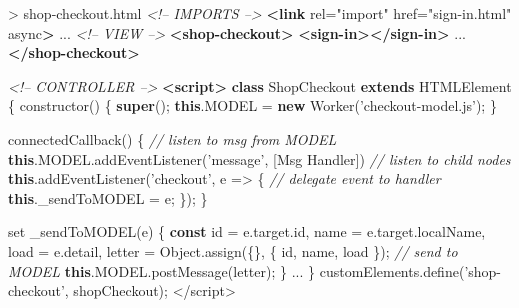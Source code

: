 \documentclass[]{article}
\newenvironment{Shaded}{}{}
\newcommand{\KeywordTok}[1]{\textcolor[rgb]{0.00,0.44,0.13}{\textbf{{#1}}}}
\newcommand{\StringTok}[1]{\textcolor[rgb]{0.25,0.44,0.63}{{#1}}}
\newcommand{\SpecialStringTok}[1]{\textcolor[rgb]{0.73,0.40,0.53}{{#1}}}
\newcommand{\CommentTok}[1]{\textcolor[rgb]{0.38,0.63,0.69}{\textit{{#1}}}}
\newcommand{\OtherTok}[1]{\textcolor[rgb]{0.00,0.44,0.13}{{#1}}}
\newcommand{\VariableTok}[1]{\textcolor[rgb]{0.10,0.09,0.49}{{#1}}}
\newcommand{\OperatorTok}[1]{\textcolor[rgb]{0.40,0.40,0.40}{{#1}}}
\newcommand{\AttributeTok}[1]{\textcolor[rgb]{0.49,0.56,0.16}{{#1}}}
\newcommand{\NormalTok}[1]{{#1}}
\begin{document}
\begin{Shaded}
\begin{Highlighting}[]
\NormalTok{> shop-checkout.html}
\CommentTok{<!-- IMPORTS -->}
\KeywordTok{<link}\OtherTok{ rel=}\StringTok{"import"}\OtherTok{ href=}\StringTok{"sign-in.html"}\OtherTok{ async}\KeywordTok{>}
\NormalTok{...}
\CommentTok{<!-- VIEW -->}
\KeywordTok{<shop-checkout>}
  \KeywordTok{<sign-in></sign-in>}
  \NormalTok{...}
\KeywordTok{</shop-checkout>}

\CommentTok{<!-- CONTROLLER -->}
\KeywordTok{<script>}
\KeywordTok{class} \NormalTok{ShopCheckout }\KeywordTok{extends} \NormalTok{HTMLElement }\OperatorTok{\{}
  \AttributeTok{constructor}\NormalTok{() }\OperatorTok{\{}
    \KeywordTok{super}\NormalTok{()}\OperatorTok{;}
    \KeywordTok{this}\NormalTok{.}\AttributeTok{MODEL} \OperatorTok{=} \KeywordTok{new} \AttributeTok{Worker}\NormalTok{(}\StringTok{'checkout-model.js'}\NormalTok{)}\OperatorTok{;}
  \OperatorTok{\}}
  
  \AttributeTok{connectedCallback}\NormalTok{() }\OperatorTok{\{}
    \CommentTok{// listen to msg from MODEL}
    \KeywordTok{this}\NormalTok{.}\VariableTok{MODEL}\NormalTok{.}\AttributeTok{addEventListener}\NormalTok{(}\StringTok{'message'}\OperatorTok{,} \NormalTok{[Msg Handler])}
    \CommentTok{// listen to child nodes}
    \KeywordTok{this}\NormalTok{.}\AttributeTok{addEventListener}\NormalTok{(}\StringTok{'checkout'}\OperatorTok{,} \NormalTok{e }\OperatorTok{=>} \OperatorTok{\{}
      \CommentTok{// delegate event to handler}
      \KeywordTok{this}\NormalTok{.}\AttributeTok{_sendToMODEL} \OperatorTok{=} \NormalTok{e}\OperatorTok{;} 
    \OperatorTok{\}}\NormalTok{)}\OperatorTok{;}
  \OperatorTok{\}}
  
  \NormalTok{set }\AttributeTok{_sendToMODEL}\NormalTok{(e) }\OperatorTok{\{}
    \KeywordTok{const} \NormalTok{id }\OperatorTok{=} \VariableTok{e}\NormalTok{.}\VariableTok{target}\NormalTok{.}\AttributeTok{id}\OperatorTok{,} 
          \NormalTok{name }\OperatorTok{=} \VariableTok{e}\NormalTok{.}\VariableTok{target}\NormalTok{.}\AttributeTok{localName}\OperatorTok{,}
          \NormalTok{load }\OperatorTok{=} \VariableTok{e}\NormalTok{.}\AttributeTok{detail}\OperatorTok{,}
          \NormalTok{letter }\OperatorTok{=} \VariableTok{Object}\NormalTok{.}\AttributeTok{assign}\NormalTok{(}\OperatorTok{\{\},} \OperatorTok{\{} \NormalTok{id}\OperatorTok{,} \NormalTok{name}\OperatorTok{,} \NormalTok{load }\OperatorTok{\}}\NormalTok{)}\OperatorTok{;}
    \CommentTok{// send to MODEL}
    \KeywordTok{this}\NormalTok{.}\VariableTok{MODEL}\NormalTok{.}\AttributeTok{postMessage}\NormalTok{(letter)}\OperatorTok{;} 
  \OperatorTok{\}}
  \NormalTok{...}
\OperatorTok{\}}    
\VariableTok{customElements}\NormalTok{.}\AttributeTok{define}\NormalTok{(}\StringTok{'shop-checkout'}\OperatorTok{,} \NormalTok{shopCheckout)}\OperatorTok{;}
\OperatorTok{<}\SpecialStringTok{/script>}
\end{Highlighting}
\end{Shaded}
\end{document}

